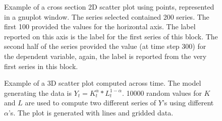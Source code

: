 \documentclass [11pt,a4paper] {book}
\begin{document}
\begin{figure}[ht]
  \centering
  \caption{\small Example of a cross section 2D scatter plot using points, represented in a gnuplot window. The series selected contained 200 series. The first 100 provided the values for the horizontal axis. The label reported on this axis is the label for the first series of this block. The second half of the series provided the value (at time step 300) for the dependent variable, again, the label is reported from the very first series in this block.}
  \label{fig:xy_cross}
\end{figure}

\begin{figure}[ht]
  \centering
  \caption{\small Example of a 3D scatter plot computed across time. The model generating the data is $Y_t=K_t^\alpha*L_t^{1-\alpha}$. 10000 random values for $K$ and $L$ are used to compute two different series of $Y$'s using different $\alpha$'s. The plot is generated with lines and gridded data.}
  \label{fig:example_scatter_time}
\end{figure}
\end{document}
